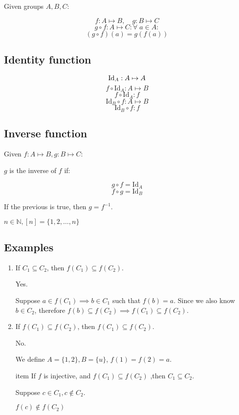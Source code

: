 \documentclass[00_complete]{subfiles}
\begin{document}
Given groups $A, B, C$:

$$f: A \mapsto B, \quad g: B \mapsto C$$
$$g \circ f: A \mapsto C: \forall \; a \in A:$$
$$(g \circ f)(a) = g(f(a))$$

\subsection{Identity function}

$$\operatorname{Id}_A: A \mapsto A$$
$$f \circ \mathrm{Id}_A: A \mapsto B$$
$$f \circ \mathrm{Id}_A: f$$
$$\mathrm{Id}_B \circ f: A \mapsto B$$
$$\mathrm{Id}_B \circ f: f$$

\subsection{Inverse function}

Given $f: A \mapsto B, g: B \mapsto C$:

$g$ is the inverse of $f$ if:

$$g \circ f = \mathrm{Id}_A$$
$$f \circ g = \mathrm{Id}_B$$

If the previous is true, then $g = f^{-1}$.

$n \in \mathbb{N}, [n] = \{1,2,\ldots, n\}$
\subsection{Examples}
\begin{example}
\begin{enumerate}
Given $f:A \mapsto B$, $C_1, C_2 \subseteq A$
\item If $C_1 \subseteq C_2$, then $f(C_1) \subseteq f(C_2)$.

Yes.

Suppose $a \in f(C_1) \implies b \in C_1$ such that $f(b)=a$. Since we also
know $b \in C_2$, therefore $f(b) \subseteq f(C_2) \implies f(C_1) \subseteq f(C_2)$.

\item If $f(C_1) \subseteq f(C_2)$, then $f(C_1) \subseteq f(C_2)$.

No.

We define $A=\{1,2\}, B=\{u\}$, $f(1)=f(2)=a$.

item If $f$ is injective, and $f(C_1) \subseteq f(C_2)$ ,then $C_1 \subseteq
C_2$.

Suppose $c \in C_1, c \notin C_2$.

$f(c) \notin f(C_2)$
\end{enumerate}
\end{example}
\end{document}
